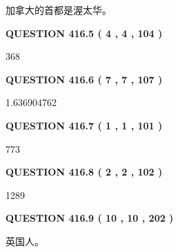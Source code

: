 \documentclass{ctexart}
\begin{document}
 
加拿大的首都是渥太华。
 
 
 
 
  
\vspace{0.2in}
  
{\textbf{\Large{QUESTION
416.5 
 ( 4 , 4 , 104 )
}}}
  
  
 
 
\noindent{}

368
 
 
  
\vspace{0.2in}
  
{\textbf{\Large{QUESTION
416.6 
 ( 7 , 7 , 107 )
}}}
  
  
 
 
\noindent{}

1.636904762
 
 
  
\vspace{0.2in}
  
{\textbf{\Large{QUESTION
416.7 
 ( 1 , 1 , 101 )
}}}
  
  
 
 
\noindent{}

773
 
 
  
\vspace{0.2in}
  
{\textbf{\Large{QUESTION
416.8 
 ( 2 , 2 , 102 )
}}}
  
  
 
 
\noindent{}

1289
 
 
  
\vspace{0.2in}
  
{\textbf{\Large{QUESTION
416.9 
 ( 10 , 10 , 202 )
}}}
  
  
 
 
\noindent{}
 
 
英国人。
 
 
 
 
  
\end{document}
